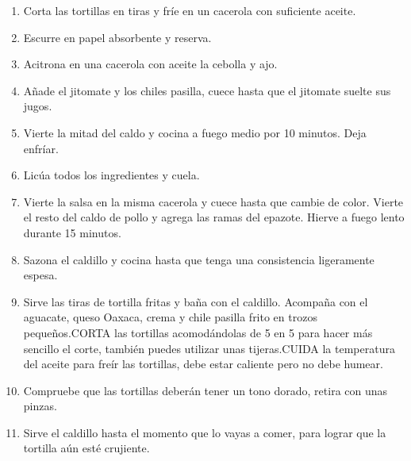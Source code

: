 \documentclass{article}
\begin{document}
\begin{enumerate}
\item Corta las tortillas en tiras y fríe en un cacerola con suficiente aceite. 
\item Escurre en papel absorbente y reserva.

\item Acitrona en una cacerola con aceite la cebolla y ajo. 

\item Añade el jitomate y los chiles pasilla, cuece hasta que el jitomate suelte sus jugos.

\item Vierte la mitad del caldo y cocina a fuego medio por 10 minutos. Deja enfríar.

\item Lic\'ua todos los ingredientes y cuela.
\item Vierte la salsa en la misma cacerola y cuece hasta que cambie de color. Vierte el resto del caldo de pollo y agrega las ramas del epazote. Hierve a fuego lento durante 15 minutos.

\item Sazona el caldillo y cocina hasta que tenga una consistencia ligeramente espesa.
\item Sirve las tiras de tortilla fritas y baña con el caldillo. Acompaña con el aguacate, queso Oaxaca, crema y chile pasilla frito en trozos pequeños.CORTA las tortillas acomodándolas de 5 en 5 para hacer más sencillo el corte, también puedes utilizar unas tijeras.CUIDA la temperatura del aceite para freír las tortillas, debe estar caliente pero no debe humear. 

\item Compruebe que las tortillas deberán tener un tono dorado, retira con unas pinzas.

\item Sirve el caldillo hasta el momento que lo vayas a comer, para lograr que la tortilla aún esté crujiente.
\end{enumerate}
\end{document}
